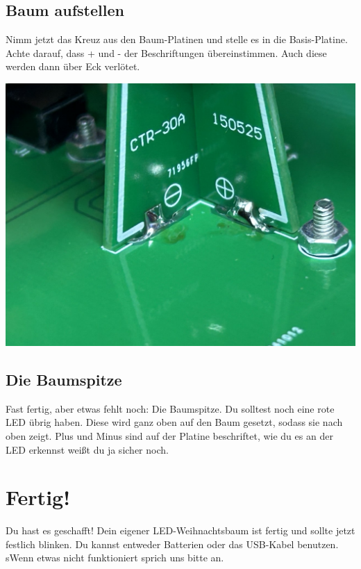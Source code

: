 \documentclass[10pt]{article}
\begin{document}
	
	\noindent\begin{minipage}{0.9\textwidth}
		\subsection{Baum aufstellen}
	Nimm jetzt das Kreuz aus den Baum-Platinen und stelle es in die Basis-Platine. Achte darauf, dass + und - der Beschriftungen übereinstimmen. Auch diese werden dann über Eck verlötet.
	\end{minipage}
	\begin{minipage}{0.1\textwidth}\raggedright
	\includegraphics[width=\linewidth]{tree-assy.png}
	\end{minipage}	
	
	\subsection{Die Baumspitze}
	Fast fertig, aber etwas fehlt noch: Die Baumspitze. Du solltest noch eine rote LED übrig haben. Diese wird ganz oben auf den Baum gesetzt, sodass sie nach oben zeigt. Plus und Minus sind auf der Platine beschriftet, wie du es an der LED erkennst weißt du ja sicher noch.
	
	\section{Fertig!}
	Du hast es geschafft! Dein eigener LED-Weihnachtsbaum ist fertig und sollte jetzt festlich blinken. Du kannst entweder Batterien oder das USB-Kabel benutzen. sWenn etwas nicht funktioniert sprich uns bitte an.
	
\end{document}
